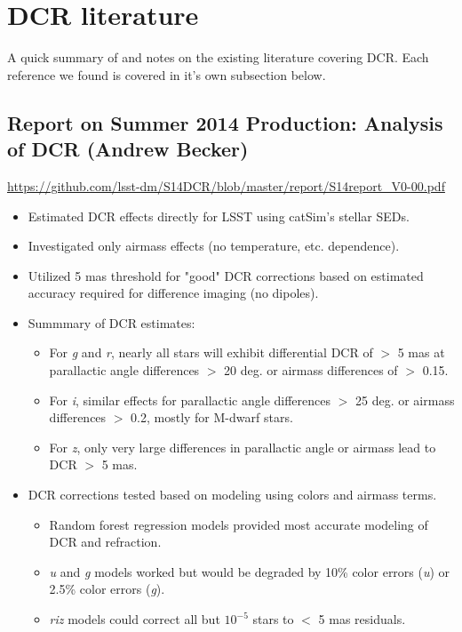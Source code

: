 \documentclass[]{article}
\begin{document}
\section{DCR literature}
A quick summary of and notes on the existing literature covering DCR. Each reference we found is covered in it's own subsection below.

\subsection{Report on Summer 2014 Production: Analysis of DCR (Andrew Becker)}

\url{https://github.com/lsst-dm/S14DCR/blob/master/report/S14report_V0-00.pdf}

\begin{itemize}
	\item Estimated DCR effects directly for LSST using catSim's stellar
	SEDs.
	\item Investigated only airmass effects (no temperature, etc. dependence).
	\item Utilized 5 mas threshold for "good" DCR corrections based on estimated accuracy required for difference imaging (no dipoles).
	\item Summmary of DCR estimates:
	
	\begin{itemize}
		
		\item For \textit{g} and \textit{r}, nearly all stars will exhibit differential DCR of $>$ 5 mas at parallactic angle differences $>$ 20 deg. or airmass differences of $>$ 0.15.
		\item For \textit{i}, similar effects for parallactic angle differences $>$ 25 deg. or airmass differences $>$ 0.2, mostly for M-dwarf stars.
		\item For \textit{z}, only very large differences in parallactic angle or airmass lead to DCR $>$ 5 mas.
	\end{itemize}
	\item DCR corrections tested based on modeling using colors and airmass terms.
	\begin{itemize}
		\item Random forest regression models provided most accurate modeling of DCR and refraction.
		\item \textit{u} and \textit{g} models worked but would be degraded by 10\% color errors (\textit{u}) or 2.5\% color errors (\textit{g}).
		\item \textit{riz} models could correct all but $10^{-5}$ stars to $<$ 5 mas residuals.
	\end{itemize}
\end{itemize}
\end{document}
